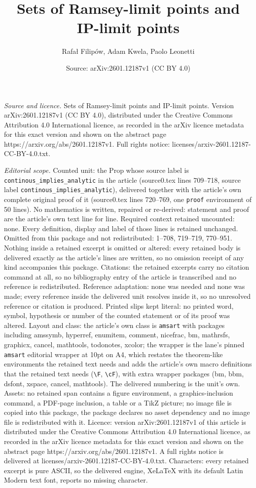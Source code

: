 \documentclass[10pt,a4paper]{amsart}
\title[Sets of Ramsey-limit points and IP-limit points]{Sets of Ramsey-limit points and IP-limit points}
\author{Rafa{\l} Filip\'ow, Adam Kwela, Paolo Leonetti}
\date{Source: arXiv:2601.12187v1 (CC BY 4.0)}
\begin{document}
\maketitle

\noindent\emph{Source and licence.} Sets of Ramsey-limit points and IP-limit points. Version arXiv:2601.12187v1 (CC BY 4.0), distributed under the Creative Commons Attribution 4.0 International licence, as recorded in the arXiv licence metadata for this exact version and shown on the abstract page https://arxiv.org/abs/2601.12187v1. Full rights notice: licenses/arxiv-2601.12187-CC-BY-4.0.txt.\par\smallskip

\noindent\textit{Editorial scope.} Counted unit: the Prop whose source label is \texttt{continous\_implies\_analytic} in the article (source0.tex lines 709--718, source label \texttt{continous\_implies\_analytic}), delivered together with the article's own complete original proof of it (source0.tex lines 720--769, one \texttt{proof} environment of 50 lines). No mathematics is written, repaired or re-derived: statement and proof are the article's own text line for line. Required context retained uncounted: none. Every definition, display and label of those lines is retained unchanged. Omitted from this package and not redistributed: 1--708, 719--719, 770--951. Nothing inside a retained excerpt is omitted or altered: every retained body is delivered exactly as the article's lines are written, so no omission receipt of any kind accompanies this package. Citations: the retained excerpts carry no citation command at all, so no bibliography entry of the article is transcribed and no reference is redistributed. Reference adaptation: none was needed and none was made; every reference inside the delivered unit resolves inside it, so no unresolved reference or citation is produced. Printed slips kept literal: no printed word, symbol, hypothesis or number of the counted statement or of its proof was altered. Layout and class: the article's own class is \texttt{amsart} with packages including amssymb, hyperref, enumitem, comment, nicefrac, bm, mathrsfs, graphicx, cancel, mathtools, todonotes, xcolor; the wrapper is the lane's pinned \texttt{amsart} editorial wrapper at 10pt on A4, which restates the theorem-like environments the retained text needs and adds the article's own macro definitions that the retained text needs (\texttt{\textbackslash F}, \texttt{\textbackslash cF}), with extra wrapper packages (bm, bbm, dsfont, xspace, cancel, mathtools). The delivered numbering is the unit's own. Assets: no retained span contains a figure environment, a graphics-inclusion command, a PDF-page inclusion, a table or a TikZ picture; no image file is copied into this package, the package declares no asset dependency and no image file is redistributed with it. Licence: version arXiv:2601.12187v1 of this article is distributed under the Creative Commons Attribution 4.0 International licence, as recorded in the arXiv licence metadata for this exact version and shown on the abstract page https://arxiv.org/abs/2601.12187v1. A full rights notice is delivered at licenses/arxiv-2601.12187-CC-BY-4.0.txt. Characters: every retained excerpt is pure ASCII, so the delivered engine, XeLaTeX with its default Latin Modern text font, reports no missing character.
\end{document}
